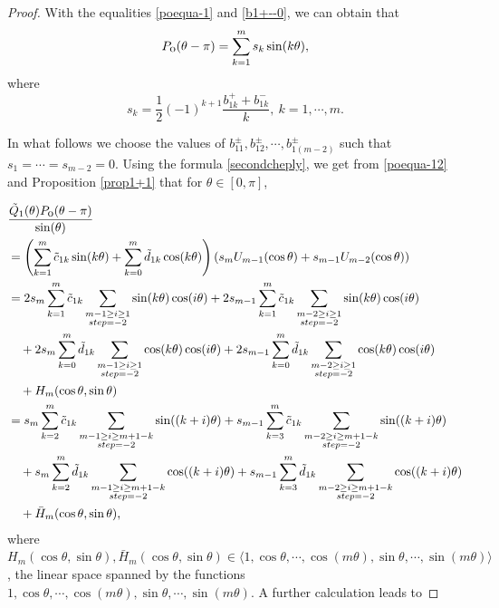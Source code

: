\documentclass[11pt]{amsart}
\theoremstyle{remark}
\theoremstyle{definition}
\begin{document}
\begin{proof}
With the equalities  \eqref{poequa-1}  and  \eqref{b1+--0},   we can obtain    that
\begin{equation} \label{poequa-12}P_{\mbox{\small{o}}}(\theta-\pi)=\sum_{k=1}^ms_k\sin (k\theta),\end{equation}
where
$$s_k=\frac{1}{2}(-1)^{k+1}\frac{b_{1k}
^++b_{1k}^-}{k}, \ k=1,\cdots, m.$$

In what follows we   choose  the values of $b_{11}^{\pm},  b_{12}^{\pm}, \cdots, b_{1 (m-2)}^{\pm}$   such that   $s_1=\cdots=s_{m-2}=0$.
Using the formula \eqref{secondcheply},
 we get from \eqref{poequa-12} and Proposition  \ref{prop1+1} that for $ \theta\in [0,\pi]$,











\begin{equation*} \label{poequa-14}
\begin{split}
& \frac{\tilde{Q}_1(\theta)P_{\mbox{\small{o}}}(\theta-\pi)}{\sin (\theta)}\\
&=\left(\sum_{k=1}^{m}\tilde{c}_{1k}\sin (k\theta)+\sum_{k=0}^m\tilde{d}_{1k}\cos (k\theta)\right)\left(s_{m}U_{m-1}(\cos \theta)+s_{m-1}U_{m-2}(\cos \theta)\right)\\
&=2s_{m}\sum_{k=1}^{m}\tilde{c}_{1k}\sum_{\substack{m-1\geq i\geq 1\\ step=-2}}\sin (k\theta)\cos(i\theta)+2s_{m-1}\sum_{k=1}^{m}\tilde{c}_{1k}\sum_{\substack{m-2\geq i\geq 1\\ step=-2}}\sin (k\theta)\cos(i\theta)\\
&\quad +2s_{m}\sum_{k=0}^m\tilde{d}_{1k}\sum_{\substack{m-1\geq i\geq 1\\ step=-2}}\cos (k\theta)\cos(i\theta) +2s_{m-1}\sum_{k=0}^m\tilde{d}_{1k}\sum_{\substack{m-2\geq i\geq 1\\ step=-2}}\cos (k\theta)\cos(i\theta)\\
&\quad +H_m(\cos\theta,\sin\theta)\\
&=s_{m}\sum_{k=2}^{m}\tilde{c}_{1k}\sum_{\substack{m-1\geq i\geq m+1-k\\ step=-2}}\sin ((k+i)\theta)+s_{m-1}\sum_{k=3}^{m}\tilde{c}_{1k}\sum_{\substack{m-2\geq i\geq m+1-k\\ step=-2}}\sin ((k+i)\theta)\\
&\quad+ s_{m}\sum_{k=2}^m\tilde{d}_{1k}\sum_{\substack{m-1\geq i\geq m+1-k\\ step=-2}}\cos ((k+i)\theta)+s_{m-1}\sum_{k=3}^m\tilde{d}_{1k}\sum_{\substack{m-2\geq i\geq m+1-k\\ step=-2}}\cos ((k+i)\theta)\\
&\quad  +\bar{H}_m(\cos\theta,\sin\theta),\\
\end{split}\end{equation*}
where $H_m(\cos\theta,\sin\theta), \bar{H}_m(\cos\theta,\sin\theta)\in  \langle 1, \cos\theta, \cdots, \cos(m\theta), \sin \theta, \cdots, \sin(m\theta)\rangle$, the linear space spanned by the functions $ 1, \cos\theta, \cdots, \cos(m\theta), \sin \theta, \cdots, \sin(m\theta)$.
A further calculation leads to


\end{proof}
\end{document}
